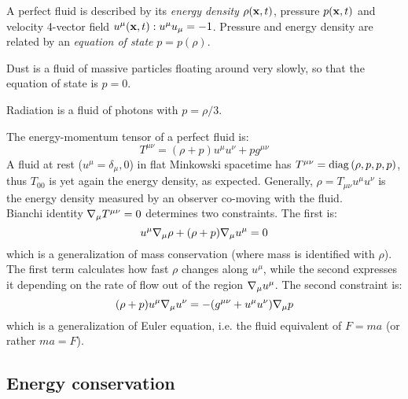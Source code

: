 A perfect fluid is described by its \textit{energy density} $ \rho(\mathbf{x},t) $, pressure $ p(\mathbf{x},t) $ and velocity 4-vector field $ u^\mu(\mathbf{x},t) : u^\mu u_\mu = -1 $. Pressure and energy density are related by an \textit{equation of state} $ p = p(\rho) $.

\begin{example}
  Dust is a fluid of massive particles floating around very slowly, so that the equation of state is $ p = 0 $.
\end{example}
\begin{example}
  Radiation is a fluid of photons with $ p = \rho / 3 $.
\end{example}

The energy-momentum tensor of a perfect fluid is:
\begin{equation}
  T^{\mu \nu} = (\rho + p) u^\mu u^\nu + p g^{\mu \nu}
  \label{eq:4.46}
\end{equation}
A fluid at rest ($ u^\mu = \delta_\mu,0 $) in flat Minkowski spacetime has $ T^{\mu \nu} = \operatorname{diag} \left( \rho, p, p, p \right) $, thus $ T_{00} $ is yet again the energy density, as expected. Generally, $ \rho = T_{\mu \nu} u^\mu u^\nu $ is the energy density measured by an observer co-moving with the fluid.\\
Bianchi identity $ \nabla_\mu T^{\mu \nu} = 0 $ determines two constraints. The first is:
\begin{equation}
  u^\mu \nabla_\mu \rho + (\rho + p) \nabla_\mu u^\mu = 0
  \label{eq:4.47}
\end{equation}
which is a generalization of mass conservation (where mass is identified with $ \rho $). The first term calculates how fast $ \rho $ changes along $ u^\mu $, while the second expresses it depending on the rate of flow out of the region $ \nabla_\mu u^\mu $. The second constraint is:
\begin{equation}
  (\rho + p) u^\mu \nabla_\mu u^\nu = - (g^{\mu \nu} + u^\mu u^\nu) \nabla_\mu p
  \label{eq:4.48}
\end{equation}
which is a generalization of Euler equation, i.e. the fluid equivalent of $ F = ma $ (or rather $ ma = F $).

\subsection{Energy conservation}

